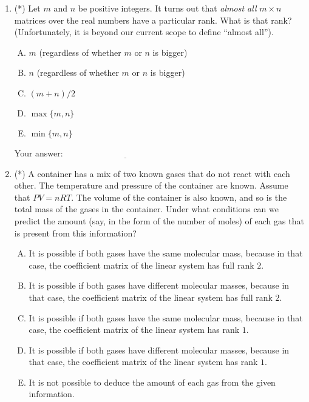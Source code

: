 \documentclass[10pt]{amsart}
\begin{document}
\begin{enumerate}
\item (*) Let $m$ and $n$ be positive integers. It turns out that {\em
  almost all} $m \times n$ matrices over the real numbers have a
  particular rank. What is that rank? (Unfortunately, it is beyond our
  current scope to define ``almost all'').

  \begin{enumerate}[(A)]
  \item $m$ (regardless of whether $m$ or $n$ is bigger)
  \item $n$ (regardless of whether $m$ or $n$ is bigger)
  \item $(m + n)/2$
  \item $\max \{ m,n \}$
  \item $\min \{ m,n \}$
  \end{enumerate}

  \vspace{0.1in}
  Your answer: $\underline{\qquad\qquad\qquad\qquad\qquad\qquad\qquad}$
  \vspace{0.1in}


\item (*) A container has a mix of two known gases that do not react
  with each other. The temperature and pressure of the container are
  known. Assume that $PV = nRT$. The volume of the container is also
  known, and so is the total mass of the gases in the container. Under
  what conditions can we predict the amount (say, in the form of the
  number of moles) of each gas that is present from this information?

  \begin{enumerate}[(A)]
  \item It is possible if both gases have the same molecular mass,
    because in that case, the coefficient matrix of the linear system
    has full rank $2$.
  \item It is possible if both gases have different molecular
    masses, because in that case, the coefficient matrix of the linear
    system has full rank $2$.
  \item It is possible if both gases have the same molecular mass,
    because in that case, the coefficient matrix of the linear system
    has rank $1$.
  \item It is possible if both gases have different molecular
    masses, because in that case, the coefficient matrix of the linear
    system has rank $1$.
  \item It is not possible to deduce the amount of each gas from the
    given information.
  \end{enumerate}


\end{enumerate}
\end{document}
